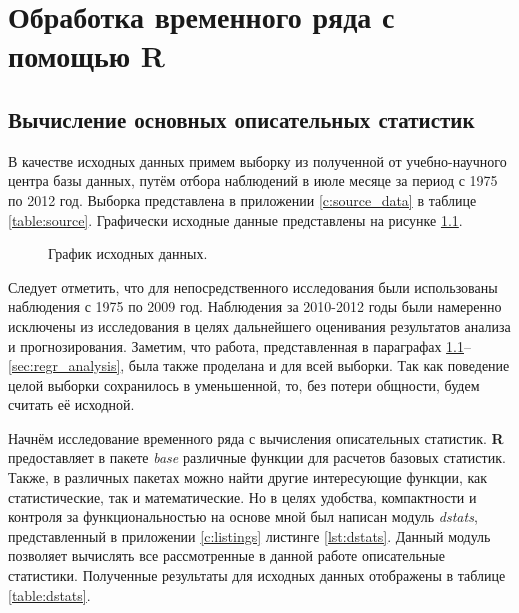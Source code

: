 \newpage

\chapter{Обработка временного ряда с помощью R}

\section{Вычисление основных описательных статистик} %
\label{sec:dstats}

В качестве исходных данных примем выборку из полученной от учебно-научного центра базы данных, путём отбора наблюдений в июле месяце за период с 1975 по 2012 год. Выборка представлена в приложении \ref{c:source_data} в таблице \ref{table:source}. Графически исходные данные представлены на рисунке \ref{img:input}.

\begin{figure}[ht]
\caption{График исходных данных.}
\label{img:input}
\end{figure}

Следует отметить, что для непосредственного исследования были использованы наблюдения с 1975 по 2009 год. Наблюдения за 2010-2012 годы были намеренно исключены из исследования в целях дальнейшего оценивания результатов анализа и прогнозирования. Заметим, что работа, представленная в параграфах \ref{sec:dstats}--\ref{sec:regr_analysis}, была также проделана и для всей выборки. Так как поведение целой выборки сохранилось в уменьшенной, то, без потери общности, будем считать её исходной.

Начнём исследование временного ряда с вычисления описательных статистик. \textbf{R} предоставляет в пакете \textit{base} различные функции для расчетов базовых статистик. Также, в различных пакетах можно найти другие интересующие функции, как статистические, так и математические. Но в целях удобства, компактности и контроля за функциональностью на основе \cite{Eliseeva1995, Cramer1997} мной был написан модуль \textit{dstats}, представленный в приложении \ref{c:listings} листинге \ref{lst:dstats}. Данный модуль позволяет вычислять все рассмотренные в данной работе описательные статистики. Полученные результаты для исходных данных отображены в таблице \ref{table:dstats}.

